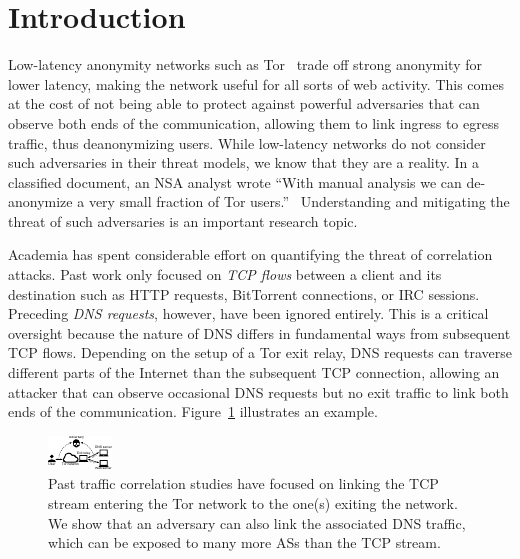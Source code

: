 \section{Introduction}
\label{sec:introduction}

Low-latency anonymity networks such as Tor~\cite{Dingledine2004a} trade off
strong anonymity for lower latency, making the network useful for all sorts of
web activity.  This comes at the cost of not being able to protect against
powerful adversaries that can observe both ends of the communication, allowing
them to link ingress to egress traffic, thus deanonymizing users.  While
low-latency networks do not consider such adversaries in their threat models,
we know that they are a reality.  In a classified document, an NSA analyst
wrote ``With manual analysis we can de-anonymize a very small fraction of Tor
users.''~\cite{torstinks} Understanding and mitigating the threat of such
adversaries is an important research topic.

Academia has spent considerable effort on quantifying the threat of correlation
attacks.  Past work only focused on \emph{TCP flows} between a client and its
destination such as HTTP requests, BitTorrent connections, or IRC sessions.
Preceding \emph{DNS requests}, however, have been ignored entirely.  This is a
critical oversight because the nature of DNS differs in fundamental ways from
subsequent TCP flows.  Depending on the setup of a Tor exit relay, DNS requests
can traverse different parts of the Internet than the subsequent TCP
connection, allowing an attacker that can observe occasional DNS requests but
no exit traffic to link both ends of the communication.
Figure~\ref{fig:overview} illustrates an example.

\begin{figure}[t]
	\centering
	\includegraphics[width=0.7\linewidth]{figures/attack-concept.pdf}
	\caption{Past traffic correlation studies have focused on linking the TCP
		stream entering the Tor network to the one(s) exiting the network.  We
		show that an adversary can also link the associated DNS traffic, which
		can be exposed to many more ASs than the TCP stream.}
	\label{fig:overview}
\end{figure}

